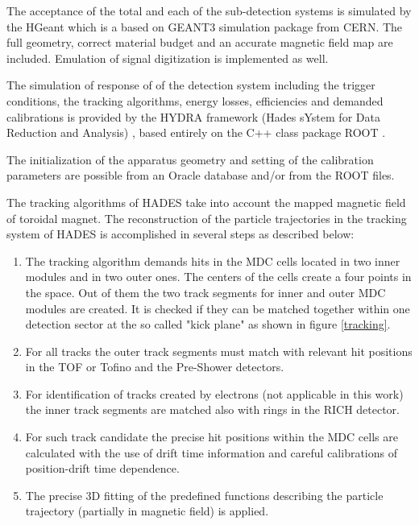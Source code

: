 The acceptance of the total and each of the sub-detection systems is simulated by the HGeant \cite{HGeant} which is a based on  GEANT3 \cite{brun1993geant} simulation package from CERN. The
full geometry, correct material budget and an accurate magnetic field map are included. Emulation of signal digitization is implemented as well.

The simulation of response of of the detection system including the trigger conditions, the tracking algorithms, energy losses, efficiencies and demanded calibrations is provided by the HYDRA framework (Hades sYstem for Data Reduction and Analysis) \cite{HYDRA}, based entirely on the C++ class package ROOT \cite{BRUN199781}. 

The initialization of the apparatus geometry and setting of the calibration parameters are  possible from an Oracle database and/or from the ROOT files. 

The tracking algorithms of HADES take into account the mapped magnetic field of toroidal magnet. The reconstruction of the particle trajectories in the tracking system of HADES is accomplished in several steps as described below:
\begin{enumerate}
\item The tracking algorithm demands hits in the MDC cells located in two inner modules and in two outer ones. 
The centers of the cells create a four points in the space. 
Out of them the two track segments for inner and outer MDC modules are created. 
It is checked if they can be matched together within one detection sector at the so called "kick plane" as shown in figure \ref{tracking}.   
\item For all tracks the outer track segments must match with relevant hit positions in the TOF or Tofino and the Pre-Shower detectors.
\item For identification of tracks created by electrons (not applicable in this work) the inner track segments are matched also  with rings in the RICH detector. 
\item  For such track candidate the precise hit positions within the MDC cells are calculated with the use of drift time information and 
careful calibrations of position-drift time dependence.
\item The precise 3D fitting of the predefined functions describing the particle trajectory (partially in magnetic field) is applied.  
\end{enumerate}

